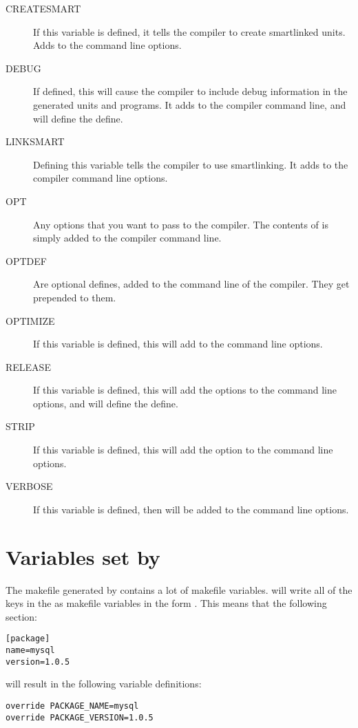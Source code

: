 \begin{description}
\item[CREATESMART] If this variable is defined, it tells the compiler to 
create smartlinked units. Adds  to the command line options.
\item[DEBUG] If defined, this will cause the compiler to include debug information in
the generated units and programs. It adds  to the compiler
command line, and will define the  define.
\item[LINKSMART] Defining this variable tells the compiler to use smartlinking. 
It adds  to the compiler command line options.
\item[OPT] Any options that you want to pass to the compiler. The contents
of  is simply added to the compiler command line.
\item[OPTDEF] Are optional defines, added to the command line of the
compiler. They get  prepended to them.
\item[OPTIMIZE] If this variable is defined, this will add  to
the command line options.
\item[RELEASE] If this variable is defined, this will add the  
options to the command line options, and will define the  define.
\item[STRIP] If this variable is defined, this will add the  option 
to the command line options.
\item[VERBOSE] If this variable is defined, then  will be added
to the command line options.
\end{description}

\section{Variables set by \fpcmake{}}

The makefile generated by \fpcmake{} contains a lot of makefile variables.
\fpcmake{} will write all of the keys in the  as
makefile variables in the form . This means that the
following section:
\begin{verbatim}
[package]
name=mysql
version=1.0.5
\end{verbatim}
will result in the following variable definitions:
\begin{verbatim}
override PACKAGE_NAME=mysql
override PACKAGE_VERSION=1.0.5
\end{verbatim}

